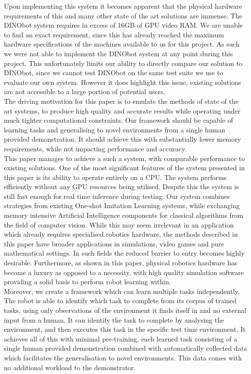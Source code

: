 Upon implementing this system it becomes apparent that the physical hardware requirements of this and many other state of the art solutions are immense. The DINObot system requires in excess of 16GB of GPU video RAM. We are unable to find an exact requirement, since this has already reached the maximum hardware specifications of the machines available to us for this project. As such we were not able to implement the DINObot system at any point during this project. This unfortunately limits our ability to directly compare our solution to DINObot, since we cannot test DINObot on the same test suite we use to evaluate our own system. However it does highlight this issue, existing solutions are not accessible to a large portion of potential users.\\

The driving motivation for this paper is to emulate the methods of state of the art systems, to produce high quality and accurate results while operating under much tighter computational constraints. Our framework should be capable of learning tasks and generalising to novel environments from a single human provided demonstration. It should achieve this with substantially lower memory requirements, while not impacting performance and accuracy.\\

This paper manages to achieve a such a system, with comparable performance to existing solutions. One of the most significant features of the system presented in this paper is its ability to operate entirely on a CPU. The system performs efficiently without any GPU resources being utilised. Despite this the system is still fast enough for real time inference during testing. Our system combines strategies from existing One-shot Imitation Learning systems, while exchanging memory intensive Artificial Intelligence components for classical algorithms from the field of computer vision. While this may seem irrelevant in an application which already requires specialised robotics hardware, the methods described in this paper have broader applications in simulations, video games and pure mathematical settings. In such fields the reduced barrier to entry becomes highly desirable. Furthermore, as shown in this paper, physical robotics hardware has become a luxury as opposed to a necessity, with high quality simulation software providing a solid basis to perform robot learning within.\\

Moreover, we create a framework which can learn multiple tasks independently. The robot is able to identify which task to complete from its corpus of trained tasks, using only observations of the environment it finds itself in and no external input from a human. It can identify the task to complete by analysing the environment, and then executes this task in the specific test time environment. It achieves all of this with minimal pre-training, each learned task consisting of a single human provided demonstration combined with automatically collected data which facilitates the generalisation to novel environments. This data comes with no additional workload to the demonstrator.\\

